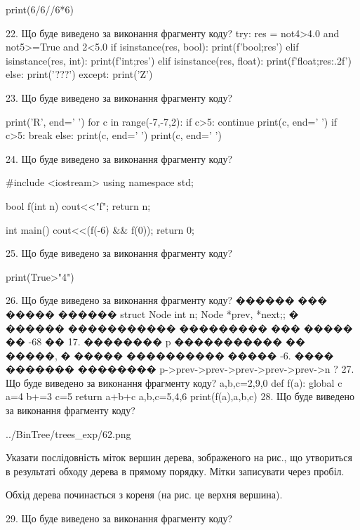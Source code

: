 \documentclass[11pt]{article}
\begin{document}
print(6/6//6*6)

22. Що буде виведено за виконання фрагменту коду?
try:
    res = not4>4.0 and not5>=True and 2<5.0
    if isinstance(res, bool):
        print(f'bool;{res}')
    elif isinstance(res, int):
        print(f'int;{res}')
    elif isinstance(res, float):
        print(f'float;{res:.2f}')
    else:
        print('???')
except:
    print('Z')

23. Що буде виведено за виконання фрагменту коду?

print('R', end=' ')
for c in range(-7,-7,2):
    if c>5:
        continue
        print(c, end=' ')
    if c>5:
        break
    else:
        print(c, end=' ')
    print(c, end=' ')

24. Що буде виведено за виконання фрагменту коду?

#include <iostream>
using namespace std;

bool f(int n){
    cout<<"f";
    return n;
}

int main(){
    cout<<(f(-6) && f(0));
    return 0;
}

25. Що буде виведено за виконання фрагменту коду?

print(True>"4")

26. Що буде виведено за виконання фрагменту коду?
������ ��� ����� ������ struct Node {int n; Node *prev, *next;};
� ������ ����������� ��������� ��� ����� �� -68 �� 17. �������� p ����������� �� �����, � ����� ���������� ����� -6.
���� ������� �������� p->prev->prev->prev->prev->prev->n ?
27. Що буде виведено за виконання фрагменту коду?
a,b,c=2,9,0
   def f(a):
     global c     a=4
     b+=3
     c=5
     return a+b+c
   a,b,c=5,4,6
   print(f(a),a,b,c)
28. Що буде виведено за виконання фрагменту коду?

\begin{center}
	{../BinTree/trees_exp/62.png}
\end{center}
Указати послідовність міток вершин дерева, зображеного на рис., що утвориться в результаті обходу дерева в прямому порядку. Мітки записувати через пробіл.\par Обхід дерева починається з кореня (на рис. це верхня вершина).

29. Що буде виведено за виконання фрагменту коду?
\end{document}
